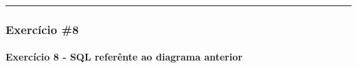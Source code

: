 \documentclass[
]{book}
\makeatletter
\newcommand*\pandocbounded[1]{%
  \sbox\pandoc@box{#1}%
  \Gscale@div\@tempa{\textheight}{\dimexpr\ht\pandoc@box+\dp\pandoc@box\relax}%
  \Gscale@div\@tempb{\linewidth}{\wd\pandoc@box}%
  \ifdim\@tempb\p@<\@tempa\p@\let\@tempa\@tempb\fi%
  \ifdim\@tempa\p@<\p@\scalebox{\@tempa}{\usebox\pandoc@box}%
  \else\usebox{\pandoc@box}%
  \fi%
}
\makeatother
\begin{document}
\begin{center}\rule{0.5\linewidth}{0.5pt}\end{center}

\subsubsection{Exercício \#8}\label{exercuxedcio-8-1}

\pandocbounded{}

\paragraph{Exercício 8 - SQL referênte ao diagrama anterior}\label{exercuxedcio-8---sql-referuxeante-ao-diagrama-anterior-1}
\end{document}
